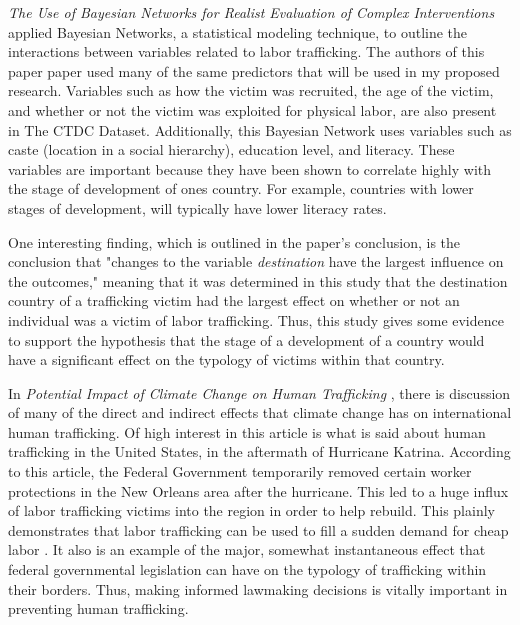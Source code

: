 \documentclass{article} %
\begin{document}

\emph{The Use of Bayesian Networks for Realist Evaluation of Complex Interventions} \parencite{Bayesian} applied Bayesian Networks, a statistical modeling technique, to outline the interactions between variables related to labor trafficking. The authors of this paper paper used many of the same predictors that will be used in my proposed research. Variables such as how the victim was recruited, the age of the victim, and whether or not the victim was exploited for physical labor, are also present in The CTDC Dataset. Additionally, this Bayesian Network uses variables such as caste (location in a social hierarchy), education level, and literacy. These variables are important because they have been shown to correlate highly with the stage of development of ones country. For example, countries with lower stages of development, will typically have lower literacy rates. 

One interesting finding, which is outlined in the paper's conclusion, is the conclusion that "changes to the variable \emph{destination} have the largest influence on the outcomes,\parencite{Bayesian}" meaning that it was determined in this study that the destination country of a trafficking victim had the largest effect on whether or not an individual was a victim of labor trafficking. Thus, this study gives some evidence to support the hypothesis that the stage of a development of a country would have a significant effect on the typology of victims within that country.




In \emph{Potential Impact of Climate Change on Human Trafficking} \parencite{Climate}, there is discussion of many of the direct and indirect effects that climate change has on international human trafficking. Of high interest in this article is what is said about human trafficking in the United States, in the aftermath of Hurricane Katrina. According to this article, the Federal Government temporarily removed certain worker protections in the New Orleans area after the hurricane. This led to a huge influx of labor trafficking victims into the region in order to help rebuild. This plainly demonstrates that labor trafficking can be used to fill a sudden demand for cheap labor \parencite{Climate}. It also is an example of the major, somewhat instantaneous effect that federal governmental legislation can have on the typology of trafficking within their borders. Thus, making informed lawmaking decisions is vitally important in preventing human trafficking.
\end{document}
